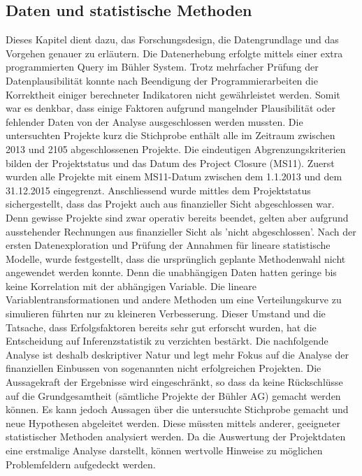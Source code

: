 \subsection{Daten und statistische Methoden}
Dieses Kapitel dient dazu, das Forschungsdesign, die Datengrundlage und das Vorgehen genauer zu erläutern. Die Datenerhebung erfolgte mittels einer extra programmierten Query im Bühler System. Trotz mehrfacher Prüfung der Datenplausibilität konnte nach Beendigung der Programmierarbeiten die Korrektheit einiger berechneter Indikatoren nicht gewährleistet werden. Somit war es denkbar, dass einige Faktoren aufgrund mangelnder Plausibilität oder fehlender Daten von der Analyse ausgeschlossen werden mussten.
\newline
Die untersuchten Projekte kurz die Stichprobe enthält alle im Zeitraum zwischen 2013 und 2105 abgeschlossenen Projekte. Die eindeutigen Abgrenzungskriterien bilden der Projektstatus und das Datum des Project Closure (MS11). Zuerst wurden alle Projekte mit einem MS11-Datum zwischen dem 1.1.2013 und dem 31.12.2015 eingegrenzt. Anschliessend wurde mittles dem Projektstatus sichergestellt, dass das Projekt auch aus finanzieller Sicht abgeschlossen war. Denn gewisse Projekte sind zwar operativ bereits beendet, gelten aber aufgrund ausstehender Rechnungen aus finanzieller Sicht als 'nicht abgeschlossen'.
\newline Nach der ersten Datenexploration und Prüfung der Annahmen für lineare statistische Modelle, wurde festgestellt, dass die ursprünglich geplante Methodenwahl nicht angewendet werden konnte. Denn die unabhängigen Daten hatten geringe bis keine Korrelation mit der abhängigen Variable. Die lineare Variablentransformationen und andere Methoden um eine Verteilungskurve zu simulieren führten nur zu kleineren Verbesserung. Dieser Umstand und die Tatsache, dass Erfolgsfaktoren bereits sehr gut erforscht wurden, hat die Entscheidung auf Inferenzstatistik zu verzichten bestärkt. Die nachfolgende Analyse ist deshalb deskriptiver Natur und legt mehr Fokus auf die Analyse der finanziellen Einbussen von sogenannten nicht erfolgreichen Projekten. Die Aussagekraft der Ergebnisse wird eingeschränkt, so dass da keine Rückschlüsse auf die Grundgesamtheit (sämtliche Projekte der Bühler AG) gemacht werden können. Es kann jedoch Aussagen über die untersuchte Stichprobe gemacht und neue Hypothesen abgeleitet werden. Diese müssten mittels anderer, geeigneter statistischer Methoden analysiert werden. Da die Auswertung der Projektdaten eine erstmalige Analyse darstellt, können wertvolle Hinweise zu möglichen Problemfeldern aufgedeckt werden.
